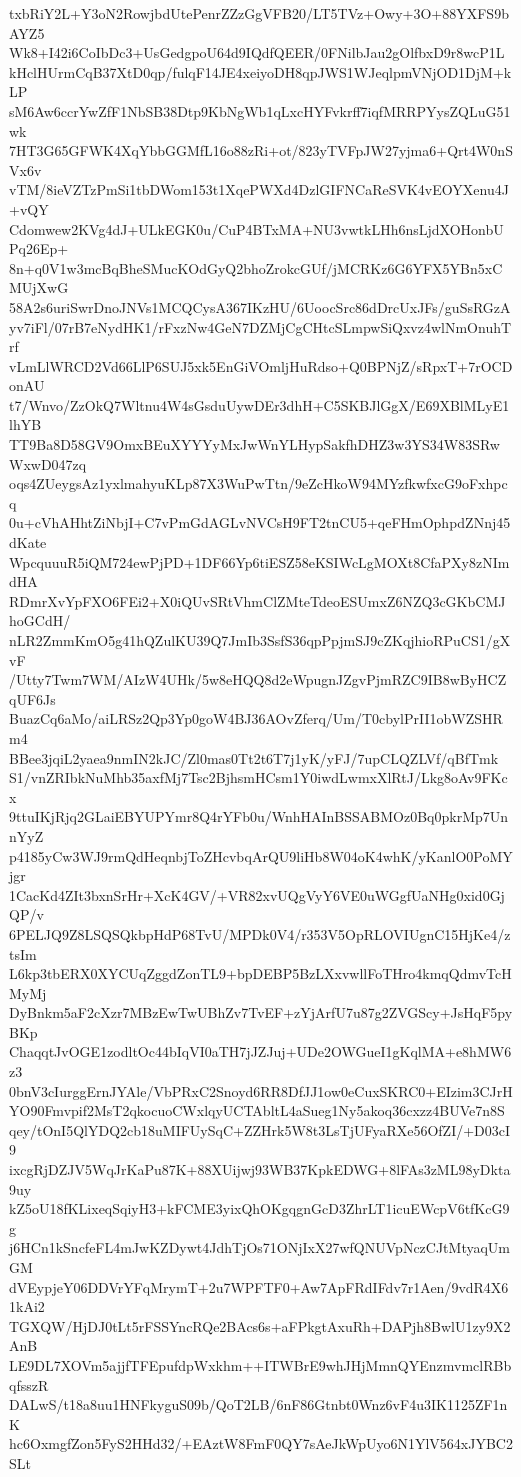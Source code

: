 txbRiY2L+Y3oN2RowjbdUtePenrZZzGgVFB20/LT5TVz+Owy+3O+88YXFS9bAYZ5
Wk8+I42i6CoIbDc3+UsGedgpoU64d9IQdfQEER/0FNilbJau2gOlfbxD9r8wcP1L
kHclHUrmCqB37XtD0qp/fulqF14JE4xeiyoDH8qpJWS1WJeqlpmVNjOD1DjM+kLP
sM6Aw6ccrYwZfF1NbSB38Dtp9KbNgWb1qLxcHYFvkrff7iqfMRRPYysZQLuG51wk
7HT3G65GFWK4XqYbbGGMfL16o88zRi+ot/823yTVFpJW27yjma6+Qrt4W0nSVx6v
vTM/8ieVZTzPmSi1tbDWom153t1XqePWXd4DzlGIFNCaReSVK4vEOYXenu4J+vQY
Cdomwew2KVg4dJ+ULkEGK0u/CuP4BTxMA+NU3vwtkLHh6nsLjdXOHonbUPq26Ep+
8n+q0V1w3mcBqBheSMucKOdGyQ2bhoZrokcGUf/jMCRKz6G6YFX5YBn5xCMUjXwG
58A2s6uriSwrDnoJNVs1MCQCysA367IKzHU/6UoocSrc86dDrcUxJFs/guSsRGzA
yv7iFl/07rB7eNydHK1/rFxzNw4GeN7DZMjCgCHtcSLmpwSiQxvz4wlNmOnuhTrf
vLmLlWRCD2Vd66LlP6SUJ5xk5EnGiVOmljHuRdso+Q0BPNjZ/sRpxT+7rOCDonAU
t7/Wnvo/ZzOkQ7Wltnu4W4sGsduUywDEr3dhH+C5SKBJlGgX/E69XBlMLyE1lhYB
TT9Ba8D58GV9OmxBEuXYYYyMxJwWnYLHypSakfhDHZ3w3YS34W83SRwWxwD047zq
oqs4ZUeygsAz1yxlmahyuKLp87X3WuPwTtn/9eZcHkoW94MYzfkwfxcG9oFxhpcq
0u+cVhAHhtZiNbjI+C7vPmGdAGLvNVCsH9FT2tnCU5+qeFHmOphpdZNnj45dKate
WpcquuuR5iQM724ewPjPD+1DF66Yp6tiESZ58eKSIWcLgMOXt8CfaPXy8zNImdHA
RDmrXvYpFXO6FEi2+X0iQUvSRtVhmClZMteTdeoESUmxZ6NZQ3cGKbCMJhoGCdH/
nLR2ZmmKmO5g41hQZulKU39Q7JmIb3SsfS36qpPpjmSJ9cZKqjhioRPuCS1/gXvF
/Utty7Twm7WM/AIzW4UHk/5w8eHQQ8d2eWpugnJZgvPjmRZC9IB8wByHCZqUF6Js
BuazCq6aMo/aiLRSz2Qp3Yp0goW4BJ36AOvZferq/Um/T0cbylPrII1obWZSHRm4
BBee3jqiL2yaea9nmIN2kJC/Zl0mas0Tt2t6T7j1yK/yFJ/7upCLQZLVf/qBfTmk
S1/vnZRIbkNuMhb35axfMj7Tsc2BjhsmHCsm1Y0iwdLwmxXlRtJ/Lkg8oAv9FKcx
9ttuIKjRjq2GLaiEBYUPYmr8Q4rYFb0u/WnhHAInBSSABMOz0Bq0pkrMp7UnnYyZ
p4185yCw3WJ9rmQdHeqnbjToZHcvbqArQU9liHb8W04oK4whK/yKanlO0PoMYjgr
1CacKd4ZIt3bxnSrHr+XcK4GV/+VR82xvUQgVyY6VE0uWGgfUaNHg0xid0GjQP/v
6PELJQ9Z8LSQSQkbpHdP68TvU/MPDk0V4/r353V5OpRLOVIUgnC15HjKe4/ztsIm
L6kp3tbERX0XYCUqZggdZonTL9+bpDEBP5BzLXxvwllFoTHro4kmqQdmvTcHMyMj
DyBnkm5aF2cXzr7MBzEwTwUBhZv7TvEF+zYjArfU7u87g2ZVGScy+JsHqF5pyBKp
ChaqqtJvOGE1zodltOc44bIqVI0aTH7jJZJuj+UDe2OWGueI1gKqlMA+e8hMW6z3
0bnV3cIurggErnJYAle/VbPRxC2Snoyd6RR8DfJJ1ow0eCuxSKRC0+EIzim3CJrH
YO90Fmvpif2MsT2qkocuoCWxlqyUCTAbltL4aSueg1Ny5akoq36cxzz4BUVe7n8S
qey/tOnI5QlYDQ2cb18uMIFUySqC+ZZHrk5W8t3LsTjUFyaRXe56OfZI/+D03cI9
ixcgRjDZJV5WqJrKaPu87K+88XUijwj93WB37KpkEDWG+8lFAs3zML98yDkta9uy
kZ5oU18fKLixeqSqiyH3+kFCME3yixQhOKgqgnGcD3ZhrLT1icuEWcpV6tfKcG9g
j6HCn1kSncfeFL4mJwKZDywt4JdhTjOs71ONjIxX27wfQNUVpNczCJtMtyaqUmGM
dVEypjeY06DDVrYFqMrymT+2u7WPFTF0+Aw7ApFRdIFdv7r1Aen/9vdR4X61kAi2
TGXQW/HjDJ0tLt5rFSSYncRQe2BAcs6s+aFPkgtAxuRh+DAPjh8BwlU1zy9X2AnB
LE9DL7XOVm5ajjfTFEpufdpWxkhm++ITWBrE9whJHjMmnQYEnzmvmclRBbqfsszR
DALwS/t18a8uu1HNFkyguS09b/QoT2LB/6nF86Gtnbt0Wnz6vF4u3IK1125ZF1nK
hc6OxmgfZon5FyS2HHd32/+EAztW8FmF0QY7sAeJkWpUyo6N1YlV564xJYBC2SLt
